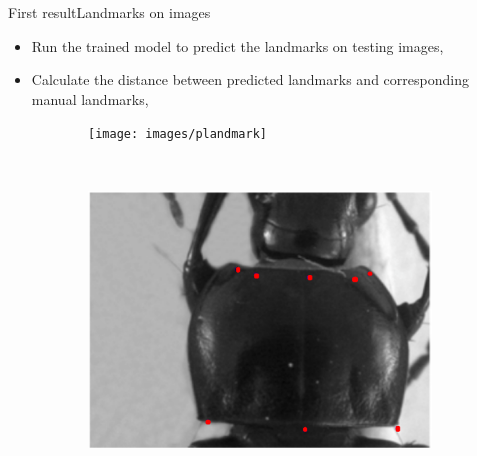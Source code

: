 \documentclass[10pt]{beamer}
\begin{document}
\begin{frame}{First result}{Landmarks on images}
\begin{itemize}
		\item Run the trained model to predict the landmarks on testing images,
		\item Calculate the distance between predicted landmarks and corresponding manual landmarks,		
	\end{itemize}
			\begin{figure}[htbp]
   				\begin{subfigure}[t]{0.5\textwidth}
        			\centering
        			\texttt{[image: images/plandmark]}
        			\caption{ }
        			\label{figsub11}
    			\end{subfigure}%
    			~ 
    			\begin{subfigure}[t]{0.5\textwidth}
        			\centering
        			\includegraphics[scale=.2]{images/plandmark2}
        			\caption{ }
        			\label{figsub22}
    			\end{subfigure}    		
			\end{figure}
\end{frame}
\end{document}
